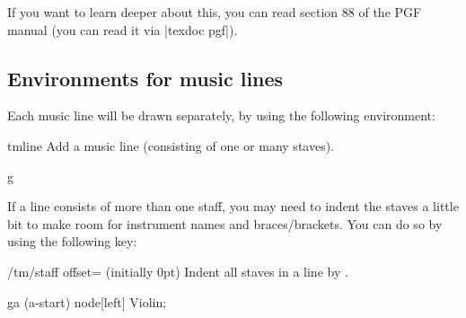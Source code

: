 If you want to learn deeper about this, you can read section 88 of the PGF 
manual (you can read it via |texdoc pgf|).
\subsection{Environments for music lines}\label{sec:init:drawing-environment}
Each music line will be drawn separately, by using the following environment:

\begin{environment}{{tmline}}
  Add a music line (consisting of one or many staves).
\end{environment}

\begin{codeexample}[]
\begin{tmline}[blue]
\begin{tmstaff}{g}{}\end{tmstaff}
\end{tmline}
\end{codeexample}

If a line consists of more than one staff, you may need to indent the staves a 
little bit to make room for instrument names and braces/brackets. You can do so 
by using the following key:

\begin{key}{/tm/staff offset= (initially 0pt)}
  Indent all staves in a line by .
\end{key}

\begin{codeexample}[]
\begin{tmline}[staff offset=1.5cm]
\begin{tmstaff}{g}{a}
  \path[overlay] (a-start) node[left] {Violin};%
\end{tmstaff}
\end{tmline}%
\end{codeexample}
